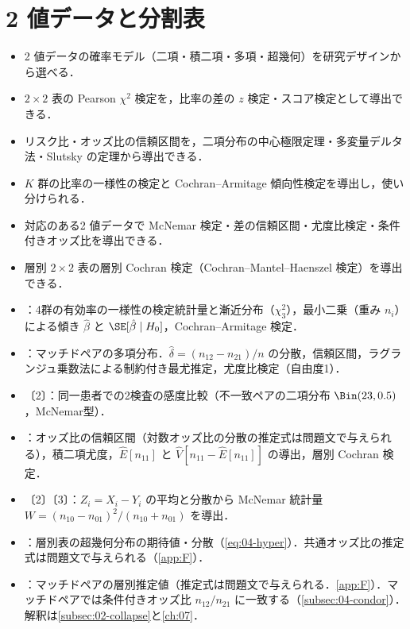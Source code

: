 \chapter{2 値データと分割表}\label{ch:04}

\begin{goalbox}
\begin{itemize}
\item 2 値データの確率モデル（二項・積二項・多項・超幾何）を研究デザインから選べる．
\item $2\times2$ 表の Pearson $\chi^2$ 検定を，比率の差の $z$ 検定・スコア検定として導出できる．
\item リスク比・オッズ比の信頼区間を，二項分布の中心極限定理・多変量デルタ法・Slutsky の定理から導出できる．
\item $K$ 群の比率の一様性の検定と Cochran--Armitage 傾向性検定を導出し，使い分けられる．
\item 対応のある2 値データで McNemar 検定・差の信頼区間・尤度比検定・条件付きオッズ比を導出できる．
\item 層別 $2\times2$ 表の層別 Cochran 検定（Cochran--Mantel--Haenszel 検定）を導出できる．
\end{itemize}
\end{goalbox}

\begin{exambox}
\begin{itemize}
\item {}：4群の有効率の一様性の検定統計量と漸近分布（$\chi^2_3$），最小二乗（重み $n_i$）による傾き $\hat\beta$ と $\SE[\hat\beta\mid H_0]$，Cochran--Armitage 検定．
\item {}：マッチドペアの多項分布．$\hat\delta=(n_{12}-n_{21})/n$ の分散，信頼区間，ラグランジュ乗数法による制約付き最尤推定，尤度比検定（自由度1）．
\item {}〔2〕：同一患者での2検査の感度比較（不一致ペアの二項分布 $\Bin(23,0.5)$，McNemar型）．
\item {}：オッズ比の信頼区間（対数オッズ比の分散の推定式は問題文で与えられる），積二項尤度，$\hat E[n_{11}]$ と $\hat V[n_{11}-\hat E[n_{11}]]$ の導出，層別 Cochran 検定．
\item {}〔2〕〔3〕：$Z_i=X_i-Y_i$ の平均と分散から McNemar 統計量 $W=(n_{10}-n_{01})^2/(n_{10}+n_{01})$ を導出．
\item {}：層別表の超幾何分布の期待値・分散（\cref{eq:04-hyper}）．共通オッズ比の推定式は問題文で与えられる（\cref{app:F}）．
\item {}：マッチドペアの層別推定値（推定式は問題文で与えられる．\cref{app:F}）．マッチドペアでは条件付きオッズ比 $n_{12}/n_{21}$ に一致する（\cref{subsec:04-condor}）．解釈は\cref{subsec:02-collapse}と\cref{ch:07}．
\end{itemize}
\end{exambox}

